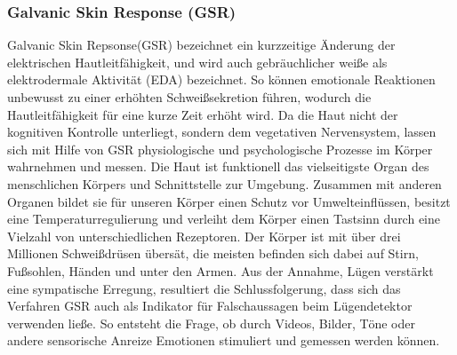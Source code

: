 \subsubsection{Galvanic Skin Response (GSR)} \label{grund-gsr-subsubsec}


Galvanic Skin Repsonse(GSR) bezeichnet ein kurzzeitige Änderung der elektrischen Hautleitfähigkeit, und wird auch gebräuchlicher weiße als elektrodermale Aktivität (EDA) bezeichnet. So können emotionale Reaktionen unbewusst zu einer erhöhten Schweißsekretion führen, wodurch die Hautleitfähigkeit für eine kurze Zeit erhöht wird. Da die Haut nicht der kognitiven Kontrolle unterliegt, sondern dem vegetativen Nervensystem, lassen sich mit Hilfe von GSR physiologische und psychologische Prozesse im Körper wahrnehmen und messen.  Die Haut ist funktionell das vielseitigste Organ des menschlichen Körpers und Schnittstelle zur Umgebung. Zusammen mit anderen Organen bildet sie für unseren Körper einen Schutz vor Umwelteinflüssen, besitzt eine Temperaturregulierung und verleiht dem Körper einen Tastsinn durch eine Vielzahl von unterschiedlichen Rezeptoren.  Der Körper ist mit über drei Millionen Schweißdrüsen übersät, die meisten befinden sich dabei auf Stirn, Fußsohlen, Händen und unter den Armen. Aus der Annahme, Lügen verstärkt eine sympatische Erregung, resultiert die Schlussfolgerung, dass sich das Verfahren GSR auch als Indikator für Falschaussagen beim Lügendetektor verwenden ließe. So entsteht die Frage, ob durch Videos, Bilder, Töne oder andere sensorische Anreize Emotionen stimuliert und gemessen werden können.
